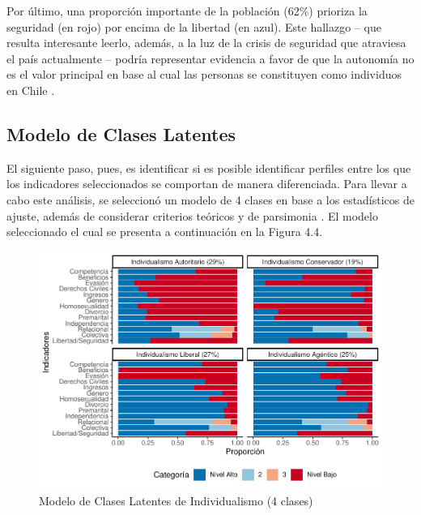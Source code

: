 \documentclass[12pt,twoside]{templates/facsothesis}
\begin{document}
Por último, una proporción importante de la población (62\%) prioriza la seguridad (en rojo) por encima de la libertad (en azul). Este hallazgo -- que resulta interesante leerlo, además, a la luz de la crisis de seguridad que atraviesa el país actualmente -- podría representar evidencia a favor de que la autonomía no es el valor principal en base al cual las personas se constituyen como individuos en Chile \citep{martuccelli2010}.

\hypertarget{modelo-de-clases-latentes}{%
\subsection*{Modelo de Clases Latentes}\label{modelo-de-clases-latentes}}

El siguiente paso, pues, es identificar si es posible identificar perfiles entre los que los indicadores seleccionados se comportan de manera diferenciada. Para llevar a cabo este análisis, se seleccionó un modelo de 4 clases en base a los estadísticos de ajuste, además de considerar criterios teóricos y de parsimonia \citep{collins2010}. El modelo seleccionado el cual se presenta a continuación en la Figura 4.4.

\begin{figure}[!ht]

{\centering \includegraphics[width=1\linewidth,]{tesis_files/figure-latex/unnamed-chunk-7-1} 

}

\caption{Modelo de Clases Latentes de Individualismo (4 clases)}\label{fig:unnamed-chunk-7}
\end{figure}
\FloatBarrier
\end{document}

